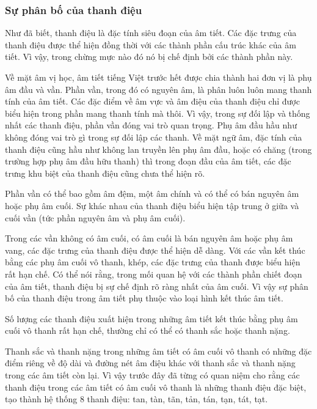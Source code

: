 \documentclass[a4paper,oneside,14pt]{extbook} %
\begin{document}
\subsubsection{Sự phân bố của thanh điệu}

Như đã biết, thanh điệu là đặc tính siêu đoạn của âm tiết. Các đặc
trưng của thanh điệu được thể hiện đồng thời với các thành phần cấu
trúc khác của âm tiết. Vì vậy, trong chừng mực nào đó nó bị chế định
bởi các thành phần này.

Về mặt âm vị học, âm tiết tiếng Việt trước hết được chia thành hai đơn
vị là phụ âm đầu và vần. Phần vần, trong đó có nguyên âm, là phân luôn
luôn mang thanh tính của âm tiết. Các đặc điểm về âm vực và âm điệu
của thanh điệu chỉ được biểu hiện trong phần mang thanh tính mà
thôi. Vì vậy, trong sự đối lập và thống nhất các thanh điệu, phần vần
đóng vai trò quan trọng. Phụ âm đầu hầu như không đóng vai trò gì
trong sự đối lập các thanh. Về mặt ngữ âm, đặc tính của thanh điệu
cũng hầu như không lan truyền lên phụ âm đầu, hoặc có chăng (trong
trường hợp phụ âm đầu hữu thanh) thì trong đoạn đầu của âm tiết, các
đặc trưng khu biệt của thanh điệu cũng chưa thể hiện rõ.

Phần vần có thể bao gồm âm đệm, một âm chính và có thể có bán nguyên
âm hoặc phụ âm cuối. Sự khác nhau của thanh điệu biểu hiện tập trung ở
giữa và cuối vần (tức phần nguyên âm và phụ âm cuối).


Trong các vần không có âm cuối, có âm cuối là bán nguyên âm hoặc phụ
âm vang, các đặc trưng của thanh điệu được thể hiện dễ dàng. 
Với các vần kết thúc bằng các phụ âm cuối vô thanh, khép, các đặc
trưng của thanh được biểu hiện rất hạn chế.
Có thể nói rằng, trong mối quan hệ với các thành phần chiết đoạn của
âm tiết, thanh điệu bị sự chế định rõ ràng nhất của âm cuối. Vì vậy sự
phân bố của thanh điệu trong âm tiết phụ thuộc vào loại hình kết thúc
âm tiết.

Số lượng các thanh điệu xuất hiện trong những âm tiết kết thúc bằng
phụ âm cuối vô thanh rất hạn chế, thường chỉ có thể có thanh sắc hoặc
thanh nặng.

Thanh sắc và thanh nặng trong những âm tiết có âm cuối vô thanh có
những đặc điểm riêng về độ dài và đường nét âm điệu khác với thanh sắc
và thanh nặng trong các âm tiết còn lại. Vì vậy trước đây đã từng có
quan niệm cho rằng các thanh điệu trong các âm tiết có âm cuối vô
thanh là những thanh điệu đặc biệt, tạo thành hệ thống 8 thanh điệu:
tan, tàn, tãn, tản, tán, tạn, tát, tạt.
\end{document}
